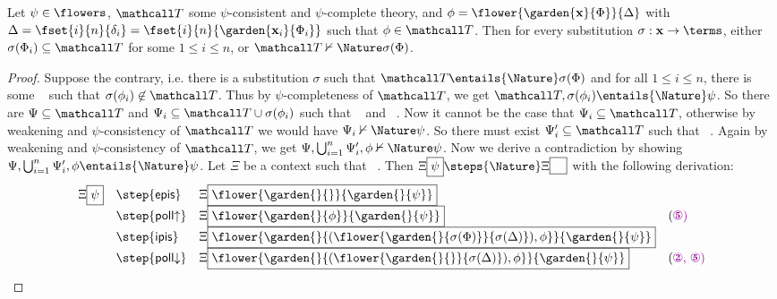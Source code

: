 \begin{proposition}
  
  Let $\psi \in \flowers$, $\tT$ some $\psi$-consistent and $\psi$-complete
  theory, and $\phi = \flower{\garden{\bx}{\Phi}}{\Delta}$ with $\Delta
  = \fset{i}{n}{\delta_i} = \fset{i}{n}{\garden{\bx_i}{\Phi_i}}$ such
  that $\phi \in \tT$. Then for every substitution $\sigma : \bx \to
  \terms$, either $\sigma(\Phi_i) \subseteq \tT$ for some $1 \leq i \leq n$, or $\tT
  \nvdash{\Nature} \sigma(\Phi)$.
\end{proposition}
\begin{proof}
  Suppose the contrary, i.e. there is a substitution $\sigma$ such that $\tT
  \entails{\Nature} \sigma(\Phi)$ and for all $1 \leq i \leq n$, there is some
  ~{\HOne} such that $\sigma(\phi_i) \not\in \tT$. Thus
  by $\psi$-completeness of $\tT$, we get $\tT, \sigma(\phi_i) \entails{\Nature}
  \psi$. So there are $\Psi \subseteq \tT$ and $\Psi_i \subseteq \tT \cup
  \sigma(\phi_i)$ such that \Hyp{$\Psi \entails{\Nature} \sigma(\Phi)$}~{\HTwo} and
  ~{\HThree}. Now it cannot be the case that
  $\Psi_i \subseteq \tT$, otherwise by weakening and $\psi$-consistency of $\tT$
  we would have $\Psi_i \nvdash{\Nature} \psi$. So there must exist $\Psi_i'
  \subseteq \tT$ such that ~{\HFour}. Again by weakening and $\psi$-consistency of $\tT$,
  we get $\Psi, \bigcup_{i = 1}^{n}{\Psi_i'}, \phi \nvdash{\Nature} \psi$. Now we
  derive a contradiction by showing $\Psi, \bigcup_{i = 1}^{n}{\Psi_i'}, \phi
  \entails{\Nature} \psi$. Let $\Xi$ be a context such that ~{\HFive}. Then $\cfill{\Xi}{\psi}
  \steps{\Nature} \cfill{\Xi}{\phantom{\Phi}}$ with the following derivation:
  $$
  \begin{array}{rlll}
    \cfill{\Xi}{\psi}
    &\step{\mathsf{epis}} &\cfill{\Xi}{\flower{\garden{{}}{{}}}{\garden{{}}{\psi}}} & \\
    &\step{\mathsf{poll{\ua}}} &\cfill{\Xi}{\flower{\garden{{}}{\phi}}{\garden{{}}{\psi}}} &\text{(\HFive)} \\
    &\step{\mathsf{ipis}} &\cfill{\Xi}{\flower{\garden{{}}{(\flower{\garden{{}}{\sigma(\Phi)}}{\sigma(\Delta)}), \phi}}{\garden{{}}{\psi}}} & \\
    &\step{\mathsf{poll{\da}}} &\cfill{\Xi}{\flower{\garden{{}}{(\flower{\garden{}{{}}}{\sigma(\Delta)}), \phi}}{\garden{{}}{\psi}}} &\text{(\HTwo, \HFive)} \\

\end{array}$$
\end{proof}

